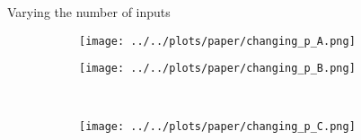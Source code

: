 \documentclass{beamer}
\begin{document}
\begin{frame}{Varying the number of inputs}
\begin{figure}[t]
\centering
\begin{subfigure}[t]{0.36\textwidth}
\texttt{[image: ../../plots/paper/changing\_p\_A.png]}
\label{supp_P_fig_A}
\end{subfigure}%
\begin{subfigure}[t]{0.27\textwidth}
\texttt{[image: ../../plots/paper/changing\_p\_B.png]}
\label{supp_P_fig_B}
\end{subfigure}\\
\begin{subfigure}[t]{0.36\textwidth}
\texttt{[image: ../../plots/paper/changing\_p\_C.png]}
\label{supp_P_fig_C}
\end{subfigure}
\end{figure}
\end{frame}
\end{document}
